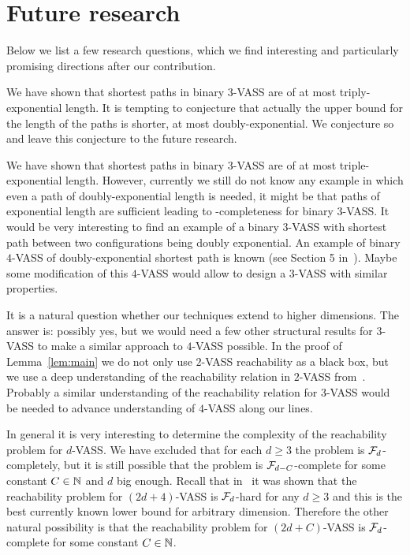 
\section{Future research}\label{sec:future}
Below we list a few research questions, which we find interesting and
particularly promising directions after our contribution.

We have shown that shortest paths in binary $3$-VASS are of at most triply-exponential length.
It is tempting to conjecture that actually the upper bound for the length of the paths is shorter,
at most doubly-exponential. We conjecture so and leave this conjecture to the future research.

We have shown that shortest paths in binary $3$-VASS are of at most triple-exponential length.
However, currently we still do not know any example in which even a path of doubly-exponential length is needed,
it might be that paths of exponential length are sufficient leading to \pspace-completeness for binary $3$-VASS.
It would be very interesting to find an example of a binary $3$-VASS with shortest path between two configurations
being doubly exponential. An example of binary $4$-VASS of doubly-exponential shortest path is known (see Section 5 in~\cite{DBLP:conf/concur/Czerwinski0LLM20}). Maybe some modification of this $4$-VASS would allow to design a $3$-VASS with similar properties.

It is a natural question whether our techniques extend to higher dimensions.
The answer is: possibly yes, but we would need a few other structural results for $3$-VASS
to make a similar approach to $4$-VASS possible. In the proof of Lemma~\ref{lem:main} we do not only
use $2$-VASS reachability as a black box, but we use a deep understanding of the reachability relation in $2$-VASS
from~\cite{DBLP:conf/focs/0001CMOSW24}. Probably a similar understanding of the reachability relation for $3$-VASS would be needed
to advance understanding of $4$-VASS along our lines. 

In general it is very interesting to determine the complexity of the reachability problem for $d$-VASS.
We have excluded that for each $d \geq 3$ the problem is $\mathcal{F}_d$-completely, but it is still possible that
the problem is $\mathcal{F}_{d-C}$-complete for some constant $C \in \mathbb{N}$ and $d$ big enough.
Recall that in~\cite{DBLP:conf/fsttcs/CzerwinskiJ0LO23}
it was shown that the reachability problem for $(2d+4)$-VASS is $\mathcal{F}_d$-hard for any $d \geq 3$ and this
is the best currently known lower bound for arbitrary dimension.
Therefore the other natural possibility is that the reachability problem for $(2d+C)$-VASS is $\mathcal{F}_d$-complete for some
constant $C \in \mathbb{N}$. 

